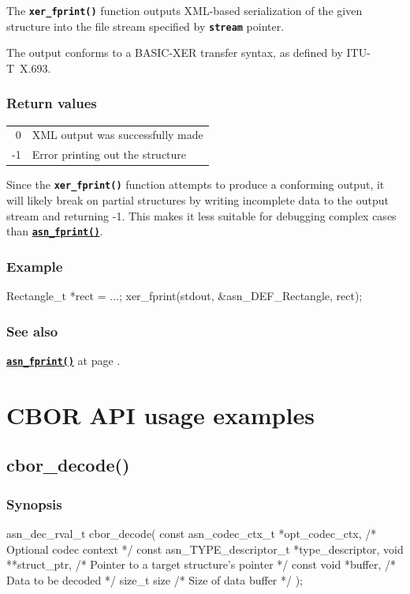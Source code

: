 \documentclass[english,oneside,12pt]{book}
\newcommand{\apisection}[2]{\clearpage\section{\label{#1}#2}}
\newcommand{\api}[2]{\hyperref[#1]{\code{#2}}}
\newcommand{\seealso}[2]{\api{#1}{#2} at page \pageref{#1}}
\newcommand{\code}[1]{\texttt{\textbf{\lstinline{#1}}}}
\begin{document}
The \code{xer_fprint()} function outputs XML-based serialization
of the given structure into the file stream specified by
\code{stream} pointer.

The output conforms to a BASIC-XER transfer syntax, as defined by ITU-T~X.693.

\subsection*{Return values}

\begin{tabular}[h!]{rl}
0 & XML output was successfully made \\
-1 & Error printing out the structure
\end{tabular}

\noindent{}Since the \code{xer_fprint()} function attempts to produce a conforming output,
it will likely break on partial structures by writing incomplete data
to the output stream and returning -1. This makes it less suitable for
debugging complex cases than \api{sec:asn_fprint}{asn_fprint()}.

\subsection*{Example}
\begin{example}
Rectangle_t *rect = ...;
xer_fprint(stdout, &asn_DEF_Rectangle, rect);
\end{example}

\subsection*{See also}
\seealso{sec:asn_fprint}{asn_fprint()}.

\chapter{CBOR API usage examples}

\apisection{sec:cbor_decode}{cbor\_decode()}

\subsection*{Synopsis}
\begin{signature}
asn_dec_rval_t cbor_decode(
    const asn_codec_ctx_t *opt_codec_ctx,   /* Optional codec context */
    const asn_TYPE_descriptor_t *type_descriptor,
    void **struct_ptr,  /* Pointer to a target structure's pointer */
    const void *buffer, /* Data to be decoded */
    size_t size         /* Size of data buffer */
);
\end{signature}
\end{document}
